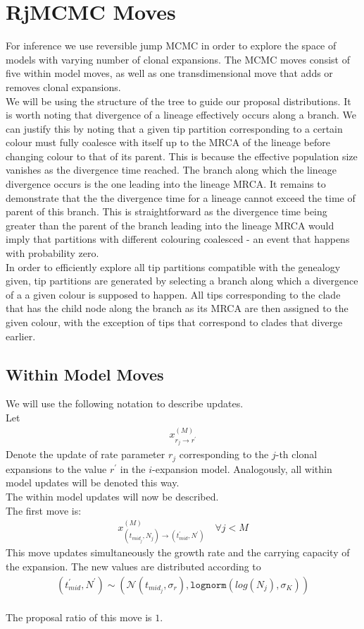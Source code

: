 \documentclass{report}
\theoremstyle{definition}
\begin{document}
\section{RjMCMC Moves}
For inference we use reversible jump MCMC in order to explore the space of models with varying number of clonal expansions.
The MCMC moves consist of five within model moves, as well as one transdimensional move that adds or removes clonal expansions.\\
We will be using the structure of the tree to guide our proposal distributions. It is worth noting that divergence of a lineage effectively occurs along a branch. We can justify this by noting that a given tip partition corresponding to a certain colour must fully coalesce with itself up to the MRCA of the lineage before changing colour to that of its parent. This is because the effective population size vanishes as the divergence time reached.
The branch along which the lineage divergence occurs is the one leading into the lineage MRCA. It remains to demonstrate that the the divergence time for a lineage cannot exceed the time of parent of this branch. This is straightforward as the divergence time being greater than the parent of the branch leading into the lineage MRCA would imply that partitions with different colouring coalesced - an event that happens with probability zero.\\
In order to efficiently explore all tip partitions compatible with the genealogy given, tip partitions are generated by selecting a branch along which a divergence of a a given colour is supposed to happen. All tips corresponding to the clade that has the child node along the branch as its MRCA are then assigned to the given colour, with the exception of tips that correspond to clades that diverge earlier. 
\subsection{Within Model Moves}
We will use the following notation to describe updates.\\ Let 
\begin{gather}
x^{(M)}_{r_j\to r^{'}}
\end{gather}
Denote the update of rate parameter $r_j$ corresponding to the $j$-th clonal expansions to the value $r^{'}$ in the $i$-expansion model. Analogously, all within model updates will be denoted this way.\\

The within model updates will now be described.\\
The first move is:
\begin{gather}
x^{(M)}_{\left(t_{mid_j},N_j\right)\to \left(t_{mid}^{'},N^{'}\right)}\quad\forall j < M
\end{gather}
This move updates simultaneously the growth rate and the carrying capacity of the expansion. The new values are distributed according to
\begin{gather}
\left(t_{mid}^{'},N^{'}\right)\sim\left(\mathcal{N}(t_{mid_j}, \sigma_r), \texttt{lognorm}(log(N_j), \sigma_K)\right) 
\end{gather}\\
The proposal ratio of this move is $1$.
\end{document}
